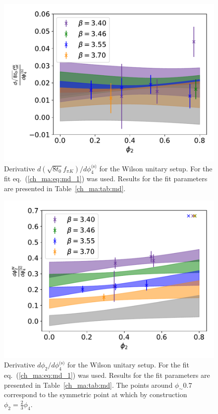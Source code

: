 \begin{figure}
    \centering
    \includegraphics[width=1.\textwidth]{./cap4/figs/der_t0fpik.pdf}
    \caption{Derivative $d\left(\sqrt{8t_0}f_{\pi K}\right)/d\phi_4^{\textrm{(s)}}$ for the Wilson unitary setup. For the fit eq.~(\ref{ch_ma:eq:md_1}) was used. Results for the fit parameters are presented in Table~\ref{ch_ma:tab:md}.}
    \label{ch_ma:fig:dfpik_w}
\end{figure}

\begin{figure}
    \centering
    \includegraphics[width=1.\textwidth]{./cap4/figs/der_phi2.pdf}
    \caption{Derivative $d\phi_2/d\phi_4^{\textrm{(s)}}$ for the Wilson unitary setup. For the fit eq.~(\ref{ch_ma:eq:md_1}) was used. Results for the fit parameters are presented in Table~\ref{ch_ma:tab:md}. The points around $\phi_\sim0.7$ correspond to the symmetric point at which by construction $\phi_2=\frac{2}{3}\phi_4$.}
    \label{ch_ma:fig:dphi2_w}
\end{figure}

